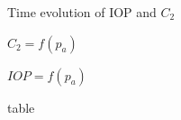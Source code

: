 \begin{figure}[htbp]
 \centering
 
  \caption[text1]{Time evolution of IOP and $C_2$ }
    \label{fig:tevolpc2}
\end{figure}
%
\begin{figure}[h]

  \caption{$C_2 = f(p_a)$}
\end{figure}
\begin{figure}[h]

  \caption{$IOP = f(p_a)$}
\end{figure}
\begin{figure}[h]
\caption{table}
\end{figure}
